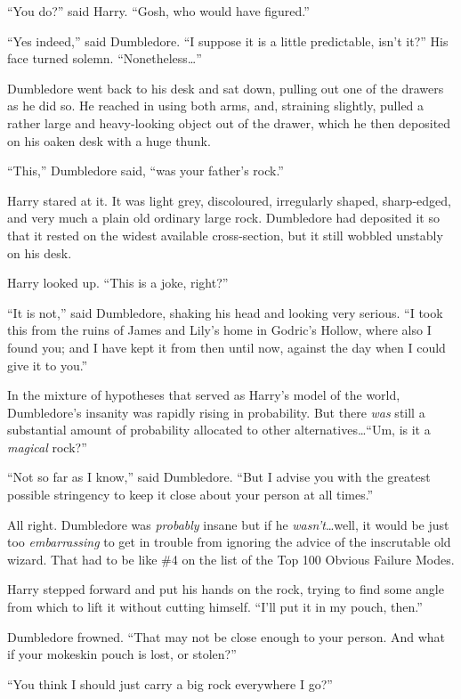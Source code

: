 “You do?” said Harry.
“Gosh, who would have figured.”

“Yes indeed,” said Dumbledore.
“I suppose it is a little predictable, isn’t it?” His face turned solemn.
“Nonetheless…”

Dumbledore went back to his desk and sat down, pulling out one of the drawers as he did so. He reached in using both arms, and, straining slightly, pulled a rather large and heavy-looking object out of the drawer, which he then deposited on his oaken desk with a huge thunk.

“This,” Dumbledore said, “was your father’s rock.”

Harry stared at it. It was light grey, discoloured, irregularly shaped, sharp-edged, and very much a plain old ordinary large rock. Dumbledore had deposited it so that it rested on the widest available cross-section, but it still wobbled unstably on his desk.

Harry looked up.
“This is a joke, right?”

“It is not,” said Dumbledore, shaking his head and looking very serious.
“I took this from the ruins of James and Lily’s home in Godric’s Hollow, where also I found you; and I have kept it from then until now, against the day when I could give it to you.”

In the mixture of hypotheses that served as Harry’s model of the world, Dumbledore’s insanity was rapidly rising in probability. But there \emph{was} still a substantial amount of probability allocated to other alternatives…“Um, is it a \emph{magical} rock?”

“Not so far as I know,” said Dumbledore.
“But I advise you with the greatest possible stringency to keep it close about your person at all times.”

All right. Dumbledore was \emph{probably} insane but if he \emph{wasn’t}…well, it would be just too \emph{embarrassing} to get in trouble from ignoring the advice of the inscrutable old wizard. That had to be like \#4 on the list of the Top 100 Obvious Failure Modes.

Harry stepped forward and put his hands on the rock, trying to find some angle from which to lift it without cutting himself.
“I’ll put it in my pouch, then.”

Dumbledore frowned.
“That may not be close enough to your person. And what if your mokeskin pouch is lost, or stolen?”

“You think I should just carry a big rock everywhere I go?”

